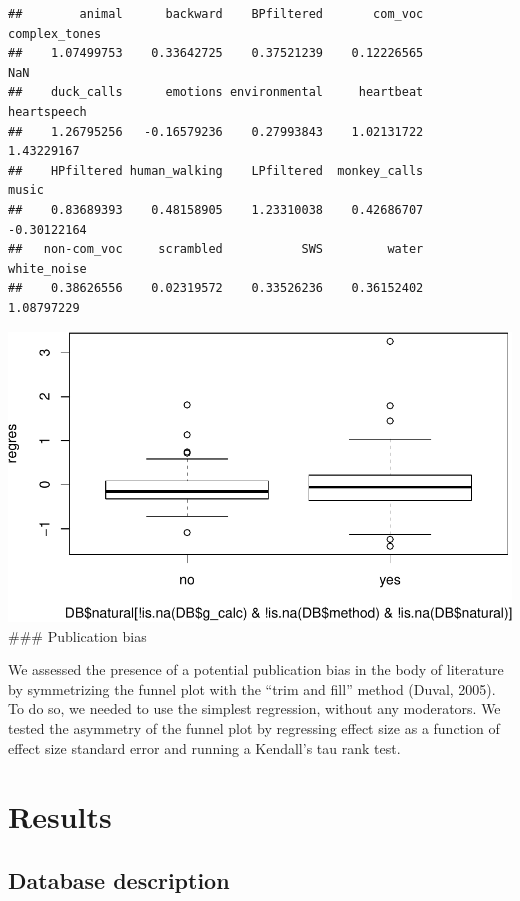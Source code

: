 \documentclass[man]{apa6}
\begin{document}
\begin{verbatim}
##        animal      backward    BPfiltered       com_voc complex_tones 
##    1.07499753    0.33642725    0.37521239    0.12226565           NaN 
##    duck_calls      emotions environmental     heartbeat   heartspeech 
##    1.26795256   -0.16579236    0.27993843    1.02131722    1.43229167 
##    HPfiltered human_walking    LPfiltered  monkey_calls         music 
##    0.83689393    0.48158905    1.23310038    0.42686707   -0.30122164 
##   non-com_voc     scrambled           SWS         water   white_noise 
##    0.38626556    0.02319572    0.33526236    0.36152402    1.08797229
\end{verbatim}

\includegraphics{MA_speech_pref_files/figure-latex/residuals-1.pdf}
\#\#\# Publication bias

We assessed the presence of a potential publication bias in the body of
literature by symmetrizing the funnel plot with the \enquote{trim and
fill} method (Duval, 2005). To do so, we needed to use the simplest
regression, without any moderators. We tested the asymmetry of the
funnel plot by regressing effect size as a function of effect size
standard error and running a Kendall's tau rank test.

\section{Results}\label{results}

\subsection{Database description}\label{database-description}
\end{document}
